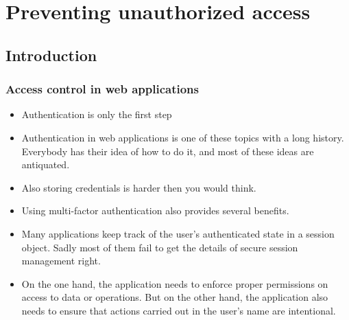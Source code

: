 \documentclass[../main.tex]{subfiles}
\begin{document}
\chapter{Preventing unauthorized access}

\section{Introduction}
\subsection{Access control in web applications}
\begin{itemize}
\item Authentication is only the first step
\item Authentication in web applications is one of these topics with a long history. Everybody has their idea of how to do it, and most of these ideas are antiquated.
\item Also storing credentials is harder then you would think.
\item Using multi-factor authentication also provides several benefits.
\item Many applications keep track of the user's authenticated state in a session object. Sadly most of them fail to get the details of secure session management right.
\item On the one hand, the application needs to enforce proper permissions on access to data or operations. But on the other hand, the application also needs to ensure that actions carried out in the user's name are intentional.
\end{itemize}
\end{document}
